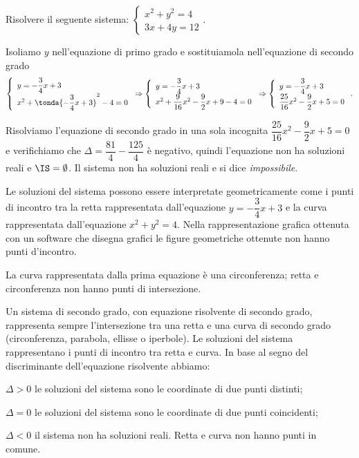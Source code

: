 \begin{esempio}
Risolvere il seguente sistema: \(\left\{\begin{array}{l}x^2+y^2=4 
\\3x+4y=12\end{array}\right..\)

Isoliamo \(y\) nell'equazione di primo grado e sostituiamola nell'equazione di 
secondo grado 
\[\left\{\begin{array}{l}y=-\dfrac 3 4x+3 \\
x^2+\tonda{-\dfrac 3 4x+3}^2-4=0\end{array}\right. 
\Rightarrow\left\{\begin{array}{l}y=-\dfrac 3 4x+3 \\
x^2+\dfrac 9{16}x^2-\dfrac 9 2x+9-4=0\end{array}\right. 
\Rightarrow\left\{\begin{array}{l}y=-\dfrac 3 4x+3 \\
\dfrac{25}{16}x^2-\dfrac{9}{2}x+5=0\end{array}\right..\]

Risolviamo l'equazione di secondo grado in una sola incognita 
\(\dfrac{25}{16}x^2-\dfrac 9 2x+5=0\) e verifichiamo che \(\Delta =\dfrac{81} 
4-\dfrac{125} 4\) è negativo, quindi l'equazione non ha soluzioni reali e 
\(\IS=\emptyset \). Il sistema non ha soluzioni reali e si dice 
\emph{impossibile}.

{Le soluzioni del sistema possono essere interpretate geometricamente come i 
punti di incontro tra la retta rappresentata dall'equazione 
\(y=-\dfrac 3 4x+3\) e la curva rappresentata dall'equazione \(x^2+y^2=4\). 
Nella rappresentazione grafica ottenuta con un software che disegna grafici 
le figure geometriche ottenute non hanno punti d'incontro.

La curva rappresentata dalla prima equazione è una circonferenza; retta e 
circonferenza non hanno punti di intersezione.}
{\begin{center}
\scalebox{0.9}{}
\end{center}}
\end{esempio}

\conclusione
Un sistema di secondo grado, con equazione risolvente di secondo grado, 
rappresenta sempre l'intersezione tra una retta e una curva di secondo grado 
(circonferenza, parabola, ellisse o iperbole). Le soluzioni del sistema 
rappresentano i punti di incontro tra retta e curva. In base al segno del 
discriminante dell'equazione risolvente abbiamo:
\begin{itemize*}
\item \(\Delta >0\) le soluzioni del sistema sono le coordinate di due punti 
distinti;
\item \(\Delta =0\) le soluzioni del sistema sono le coordinate di due punti 
coincidenti;
\item \(\Delta <0\) il sistema non ha soluzioni reali. Retta e curva non hanno 
punti in comune.
\end{itemize*}
\begin{center}

\end{center}

